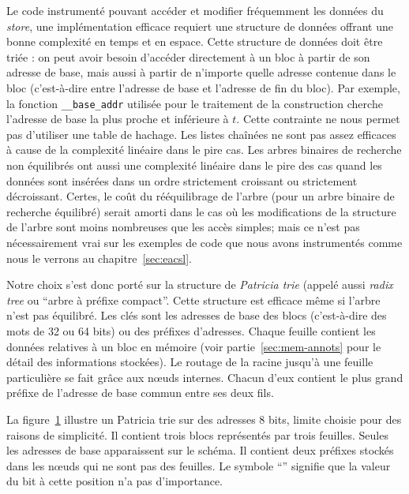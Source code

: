 Le code instrumenté pouvant accéder et modifier fréquemment les données du
\textit{store}, une implémentation efficace requiert une structure de données
offrant une bonne complexité en temps et en espace.
Cette structure de données doit être triée : on peut avoir besoin d'accéder
directement à un bloc à partir de son adresse de base, mais aussi à partir de
n'importe quelle adresse contenue dans le bloc (c'est-à-dire entre l'adresse de
base et l'adresse de fin du bloc).
Par exemple, la fonction \lstinline'__base_addr' utilisée pour le traitement
de la construction \baseaddrt cherche l'adresse de base la plus proche et
inférieure à $t$.
Cette contrainte ne nous permet pas d'utiliser une table de hachage.
Les listes chaînées ne sont pas assez efficaces à cause de la complexité
linéaire dans le pire cas.
Les arbres binaires de recherche non équilibrés ont aussi une complexité
linéaire dans le pire des cas quand les données sont insérées dans un ordre
strictement croissant ou strictement décroissant.
Certes, le coût du rééquilibrage de l'arbre (pour un arbre binaire de recherche
équilibré) serait amorti dans le cas où les modifications de la structure de
l'arbre sont moins nombreuses que les accès simples; mais ce n'est pas
nécessairement vrai sur les exemples de code que nous avons instrumentés comme
nous le verrons au chapitre~\ref{sec:eacsl}.

Notre choix s'est donc porté sur la structure de {\em Patricia trie}
\cite{Szpankowski/90} (appelé aussi {\em radix tree} ou ``arbre à préfixe
compact''.
Cette structure est efficace même si l'arbre n'est pas équilibré.
Les clés sont les adresses de base des blocs (c'est-à-dire des mots de 32 ou 64
bits) ou des préfixes d'adresses.
Chaque feuille contient les données relatives à un bloc en mémoire (voir
partie~\ref{sec:mem-annots} pour le détail des informations stockées).
Le routage de la racine jusqu'à une feuille particulière se fait grâce aux
n\oe{}uds internes.
Chacun d'eux contient le plus grand préfixe de l'adresse de base commun entre
ses deux fils.

La figure~\ref{fig:insertion-Patricia-trie-0} illustre un Patricia
trie sur des adresses 8 bits, limite choisie pour des raisons de simplicité.
Il contient trois blocs représentés par trois feuilles.
Seules les adresses de base apparaissent sur le schéma.
Il contient deux préfixes stockés dans les n\oe{}uds qui ne sont pas des
feuilles.
Le symbole ``{\tt *}'' signifie que la valeur du bit à cette position n'a pas
d'importance.

\begin{figure}[h]
  
  \label{fig:insertion-Patricia-trie-0}
\end{figure}

